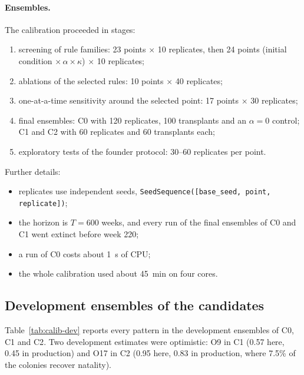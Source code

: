 \paragraph{Ensembles.}
The calibration proceeded in stages:
\begin{enumerate}
  \item screening of rule families: 23 points $\times$ 10 replicates, then 24 points (initial condition
    $\times\,\alpha\times\kappa$) $\times$ 10 replicates;
  \item ablations of the selected rules: 10 points $\times$ 40 replicates;
  \item one-at-a-time sensitivity around the selected point: 17 points $\times$ 30 replicates;
  \item final ensembles: \textsf{C0} with 120 replicates, 100 transplants and an $\alpha=0$ control;
    \textsf{C1} and \textsf{C2} with 60 replicates and 60 transplants each;
  \item exploratory tests of the founder protocol: 30--60 replicates per point.
\end{enumerate}
Further details:
\begin{itemize}
  \item replicates use independent seeds, \texttt{SeedSequence([base\_seed, point, replicate])};
  \item the horizon is $T=600$ weeks, and every run of the final ensembles of \textsf{C0} and \textsf{C1}
    went extinct before week 220;
  \item a run of \textsf{C0} costs about 1~s of CPU;
  \item the whole calibration used about 45~min on four cores.
\end{itemize}

\subsection{Development ensembles of the candidates}
\label{app:calib-dev}

Table~\ref{tab:calib-dev} reports every pattern in the development ensembles of \textsf{C0}, \textsf{C1} and
\textsf{C2}. Two development estimates were optimistic: O9 in \textsf{C1} (0.57 here, 0.45 in production) and
O17 in \textsf{C2} (0.95 here, 0.83 in production, where 7.5\% of the colonies recover natality).

